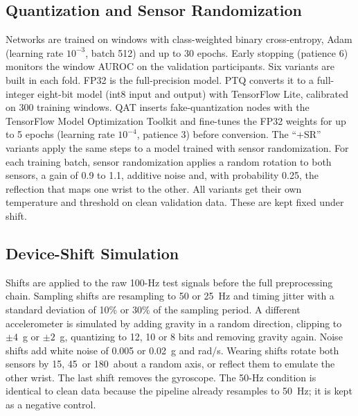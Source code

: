 \documentclass[journal,twoside,web]{ieeecolor}
\begin{document}
\subsection{Quantization and Sensor Randomization}
Networks are trained on windows with class-weighted binary cross-entropy, Adam (learning rate $10^{-3}$, batch 512) and up to 30 epochs. Early stopping (patience 6) monitors the window AUROC on the validation participants. Six variants are built in each fold. FP32 is the full-precision model. PTQ converts it to a full-integer eight-bit model (int8 input and output) with TensorFlow Lite, calibrated on 300 training windows. QAT inserts fake-quantization nodes with the TensorFlow Model Optimization Toolkit and fine-tunes the FP32 weights for up to 5 epochs (learning rate $10^{-4}$, patience 3) before conversion. The ``+SR'' variants apply the same steps to a model trained with sensor randomization. For each training batch, sensor randomization applies a random rotation to both sensors, a gain of 0.9 to 1.1, additive noise and, with probability 0.25, the reflection that maps one wrist to the other. All variants get their own temperature and threshold on clean validation data. These are kept fixed under shift.

\subsection{Device-Shift Simulation}
Shifts are applied to the raw 100-Hz test signals before the full preprocessing chain. Sampling shifts are resampling to 50 or 25~Hz and timing jitter with a standard deviation of 10\% or 30\% of the sampling period. A different accelerometer is simulated by adding gravity in a random direction, clipping to $\pm4$~g or $\pm2$~g, quantizing to 12, 10 or 8 bits and removing gravity again. Noise shifts add white noise of 0.005 or 0.02~g and rad/s. Wearing shifts rotate both sensors by 15\textdegree, 45\textdegree\ or 180\textdegree\ about a random axis, or reflect them to emulate the other wrist. The last shift removes the gyroscope. The 50-Hz condition is identical to clean data because the pipeline already resamples to 50~Hz; it is kept as a negative control.
\end{document}
